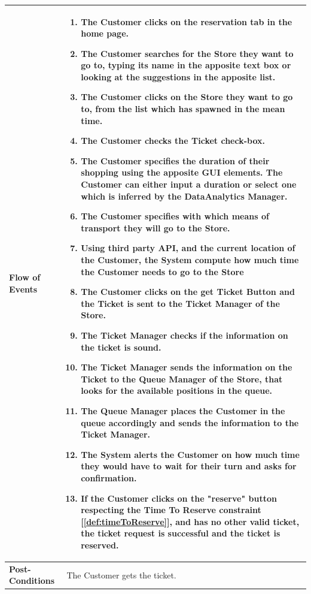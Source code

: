 \documentclass[a4paper, 12pt, oneside]{article}
\begin{document}
\begin{tabularx}{\linewidth}{| l | X |}
	\hline
	\textbf{Flow of Events} & \parbox{0.7\textwidth}{	
		\begin{enumerate}
		    \item The Customer clicks on the reservation tab in the home page.
			\item The Customer searches for the Store they want to go to, typing its name in the apposite text box or looking at the suggestions in the apposite list.
			\item The Customer clicks on the Store they want to go to, from the list which has spawned in the mean time.
			\item The Customer checks the Ticket check-box.
			\item The Customer specifies the duration of their shopping using the apposite GUI elements. The Customer can either input a duration or select one which is inferred by the DataAnalytics Manager.
			\item The Customer specifies with which means of transport they will go to the Store.
			\item Using third party API, and the current location of the Customer, the System compute how much time the Customer needs to go to the Store
			\item The Customer clicks on the get Ticket Button and the Ticket is sent to the Ticket Manager of the Store.
			\item The Ticket Manager checks if the information on the ticket is sound.
			\item The Ticket Manager sends the information on the Ticket to the Queue Manager of the Store, that looks for the available positions in the queue.
			\item The Queue Manager places the Customer in the queue accordingly and sends the information to the Ticket Manager.
			\item The System alerts the Customer on how much time they would have to wait for their turn and asks for confirmation.
			\item If the Customer clicks on the "reserve" button respecting the Time To Reserve constraint [\ref{def:timeToReserve}], and has no other valid ticket, the ticket request is successful and the ticket is reserved.
	\end{enumerate}}\\
	
	\hline
	\textbf{Post-Conditions} & The Customer gets the ticket.\\
	

\end{tabularx}
\end{document}
